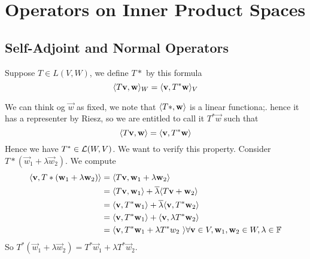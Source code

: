 \section{Operators on Inner Product Spaces}
\subsection{Self-Adjoint and Normal Operators}
\begin{definition}
	Suppose $T \in L(V,W)$, we define $T*$ by this formula 
	\[ \langle T\mathbf v, \mathbf w \rangle_W = \langle \mathbf v, T^* \mathbf w \rangle_V\]
\end{definition}
We can think og $\vec w$ as fixed, we note that $\langle T \ast, \mathbf w \rangle$ is a linear functiona;. hence it has a representer by Riesz, so we are entitled to call it $T^*\vec w$ such that 
\[ \langle T\mathbf v, \mathbf w \rangle = \langle \mathbf v, T^* \mathbf w \rangle \]
Hence we have $T^* \in \mathcal L(W,V)$. We want to verify this property. Consider $T*(\vec w_1 + \lambda \vec w_2)$. We compute 
\begin{align*}
	\langle \mathbf v, T*(\mathbf w_1 + \lambda \mathbf w_2) \rangle &= \langle T\mathbf v, \mathbf w_1 + \lambda \mathbf w_2\rangle \\
	&= \langle T\mathbf v, \mathbf w_1 \rangle + \overline \lambda \langle T\mathbf v + \mathbf w_2 \rangle \\
	&= \langle \mathbf v, T^*\mathbf w_1 \rangle +  \overline \lambda \langle \mathbf v, T^* \mathbf w_2 \rangle \\
	&= \langle \mathbf v, T^*\mathbf w_1 \rangle +   \langle \mathbf v, \lambda T^* \mathbf w_2 \rangle \\
	&= \langle \mathbf v, T^*\mathbf w_1 +  \lambda T^*w_2 \ \rangle \forall \mathbf v \in V, \mathbf w_1, \mathbf w_2 \in W, \lambda \in \mathbb F 
\end{align*}
So $T^*(\vec w_1 + \lambda \vec w_2) = T^* \vec w_1 + \lambda T^* \vec w_2$.

